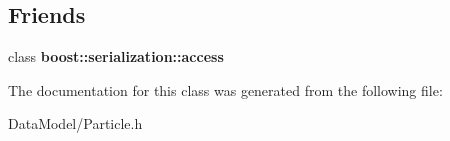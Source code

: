\subsection*{Friends}
\begin{DoxyCompactItemize}
\item 
\hypertarget{classMCParticle_ac98d07dd8f7b70e16ccb9a01abf56b9c}{
class {\bfseries boost::serialization::access}}
\label{classMCParticle_ac98d07dd8f7b70e16ccb9a01abf56b9c}

\end{DoxyCompactItemize}


The documentation for this class was generated from the following file:\begin{DoxyCompactItemize}
\item 
DataModel/Particle.h\end{DoxyCompactItemize}
